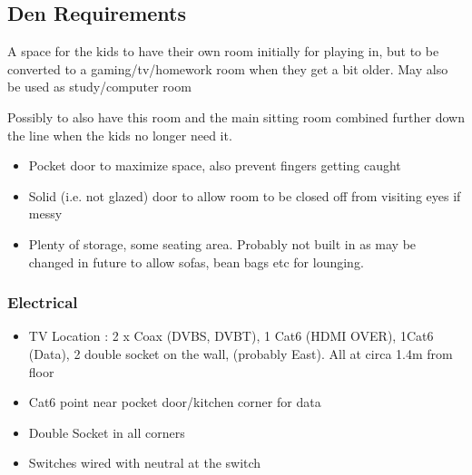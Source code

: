 \subsection{Den Requirements}
A space for the kids to have their own room initially for playing in, but to be converted to a gaming/tv/homework room
when they get a bit older. May also be used as study/computer room

Possibly to also have this room and the main sitting room combined further down the line when the kids no longer need it.
\begin{itemize}
\item Pocket door to maximize space, also prevent fingers getting caught
\item Solid (i.e. not glazed) door to allow room to be closed off from visiting eyes if messy
\item Plenty of storage, some seating area. Probably not built in as may be changed in future to allow sofas, bean bags etc for lounging.
\end{itemize}


\subsubsection{Electrical}
\begin{itemize}
\item TV Location : 2 x Coax (DVBS, DVBT), 1 Cat6 (HDMI OVER), 1Cat6 (Data), 2 double socket on the wall, (probably East). All at circa 1.4m from floor
\item Cat6 point near pocket door/kitchen corner for data
\item Double Socket in all corners
\item Switches wired with neutral at the switch
\end{itemize}
